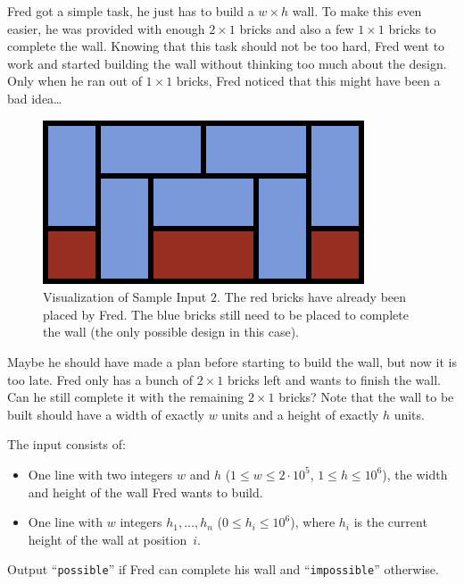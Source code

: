 %
Fred got a simple task, he just has to build a $w\times h$ wall.
To make this even easier, he was provided with enough $2\times1$ bricks and also a few $1\times1$ bricks to complete the wall.
Knowing that this task should not be too hard, Fred went to work and started building the wall without thinking too much about the design.
Only when he ran out of $1\times1$ bricks, Fred noticed that this might have been a bad idea\dots

\begin{figure}[h]
	\centering
	\includegraphics{sample}
	\caption{Visualization of Sample Input $2$.
	The red bricks have already been placed by Fred.
	The blue bricks still need to be placed to complete the wall (the only possible design in this case).}
\end{figure}
	
Maybe he should have made a plan before starting to build the wall, but now it is too late.
Fred only has a bunch of $2\times1$ bricks left and wants to finish the wall.
Can he still complete it with the remaining $2\times 1$ bricks?
Note that the wall to be built should have a width of exactly $w$ units and a height of exactly $h$ units.

\begin{Input}
	The input consists of:
	\begin{itemize}
		\item One line with two integers $w$ and $h$ ($1\leq w\leq2\cdot10^5$, $1\leq h\leq10^6$), the width and height of the wall Fred wants to build.
		\item One line with $w$ integers $h_1,\dots,h_n$ ($0\leq h_i\leq 10^6$), where $h_i$ is the current height of the wall at position~$i$.
	\end{itemize}
\end{Input}

\begin{Output}
	Output ``\texttt{possible}'' if Fred can complete his wall and ``\texttt{impossible}'' otherwise.
\end{Output}
